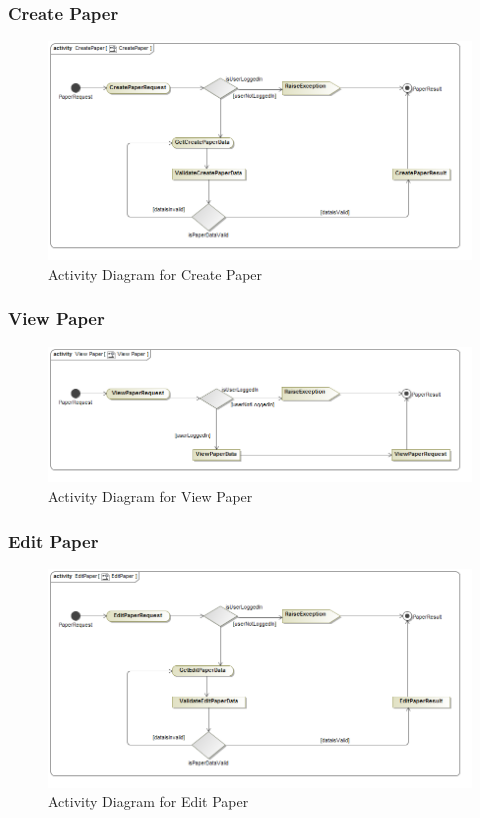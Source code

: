 \documentclass[a4paper,10pt]{article}
\begin{document}
	\subsubsection{Create Paper}
	\begin{figure}[H]
		\includegraphics[scale=0.5]{Activity_CreatePaper}
		\caption{Activity Diagram for Create Paper}
	\end{figure}

\subsubsection{View Paper}
	\begin{figure}[H]
		\includegraphics[scale=0.5]{Activity_ViewPaper}
		\caption{Activity Diagram for View Paper}
	\end{figure}

\subsubsection{Edit Paper}
	\begin{figure}[H]
		\includegraphics[scale=0.5]{Activity_EditPaper}
		\caption{Activity Diagram for Edit Paper}
	\end{figure}
\end{document}

